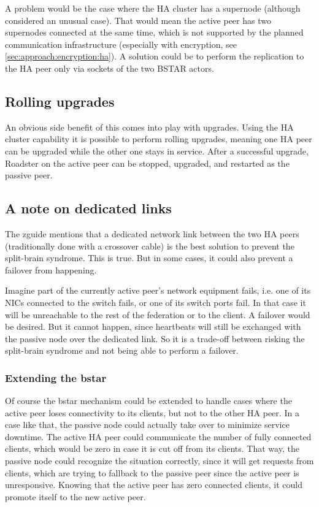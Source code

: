 {\color{red}A problem would be the case where the HA cluster has a supernode (although
considered an unusual case). That would mean the active peer has two supernodes
connected at the same time, which is not supported by the planned communication
infrastructure (especially with encryption, see
\autoref{sec:approach:encryption:ha}).  A solution could be to perform the
replication to the HA peer only via sockets of the two BSTAR actors.}

\subsection{Rolling upgrades}
An obvious side benefit of this comes into play with upgrades. Using the HA
cluster capability it is possible to perform rolling upgrades, meaning one HA
peer can be upgraded while the other one stays in service. After a successful
upgrade, Roadster on the active peer can be stopped, upgraded, and restarted as
the passive peer.

\subsection{A note on dedicated links}
The \gls{zguide} mentions that a dedicated network link between the two HA peers
(traditionally done with a crossover cable) is the best solution to prevent the
split-brain syndrome. This is true. But in some cases, it could also prevent a
failover from happening.

Imagine part of the currently active peer's network equipment fails, i.e. one
of its \glspl{NIC} connected to the switch fails, or one of its switch ports
fail. In that case it will be unreachable to the rest of the
federation or to the client. A failover would be desired. But it
cannot happen, since heartbeats will still be exchanged with the passive node over
the dedicated link. So it is a trade-off between risking the split-brain
syndrome and not being able to perform a failover.

\subsubsection{Extending the \gls{bstar}}\label{sec:approach:ha:bstar-ext}
Of course the \gls{bstar} mechanism could be extended to handle cases where the
active peer loses connectivity to its clients, but not to the other HA peer. In
a case like that, the passive node could actually take over to minimize
service downtime. The active HA peer could communicate the number of fully connected clients,
which would be zero in case it is cut off from its clients. That way, the
passive node could recognize the situation correctly, since it will get
requests from clients, which are trying to fallback to the passive peer since
the active peer is unresponsive. Knowing that the active peer has zero
connected clients, it could promote itself to the new active peer.

